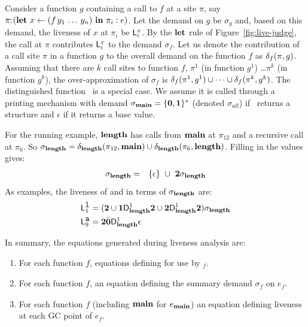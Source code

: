 \documentclass[9pt]{sigplanconf}
\begin{document}
Consider a function $g$ containing a  call to $f$ at a site $\pi$, say
$\pi\!\!:\!(\mbox{$\mathbf{ let}$}~x   \leftarrow   (f\,y_1\,\ldots\,y_n)~\mbox{$\mathbf{ in}$}~\pi_i:e)$.
Let the  demand on $g$  be $\sigma_g$ and,  based on this  demand, the
liveness of  $x$ at $\pi_i$ be  $\mathsf{L}_{{i}}^{x}$.  By the  $\mbox{$\mathbf{ let}$}$ rule of
Figure~\ref{fig:live-judge},    the   call   at    $\pi$   contributes
$\mathsf{L}_{{i}}^{x}$ to the demand $\sigma_f$. Let us denote the contribution
of a call  site $\pi$ in a  function $g$ to the overall  demand on the
function $f$  as $\delta_{f}({\pi},{g})$. Assuming that  there are $k$
call sites to function $f$, $\pi^1$ (in function $g^1$) \ldots $\pi^k$
(in   function  $g^k$),  the   over-approximation  of   $\sigma_f$  is
$\delta_{f}({\pi^1},{g^1})          \cup          \cdots          \cup
\delta_{f}({\pi^k},{g^k})$.  The distinguished function \mainpgm\ is a
special case.   We assume  it is called  through a  printing mechanism
with   demand   $\sigma_{\mathbf{main}}   =  \{\mathbf{0},\mathbf{1}\}^\ast$ (denoted
$\sigma_{\!all}$) if \mainpgm\ returns a structure and $\epsilon$ if
it returns a base value.


For  the  running  example,   $\mathbf{length}$  has  calls  from  $\mathbf{main}$  at
$\pi_{12}$ and a recursive call at $\pi_6$.
So $\sigma_{\mathbf{length}} =
     \delta_{\mathbf{length}}({\pi_{12}},{\mathbf{main}})  \cup
\delta_{\mathbf{length}}({\pi_6},{\mathbf{length}})$.
Filling in  the values gives:
\begin{eqnarray*}
\sigma_{\mathbf{length}}    &=&
 \{\epsilon\}  ~\cup~{{\mathbf{2}}\sigma_{\mathit{\mathbf{length}}}}
\end{eqnarray*}
As examples, the liveness of  and  in terms
of  $\sigma_{\mathbf{length}}$ are:
\begin{align*}
\mathsf{L}_{{1}}^{\mbox{\tt l}} &= ({\mathbf{2}} \cup \mathbf{1}\mathsf{D}_{\mathit {\mathbf{length}}}^{1}{\mathbf{2}}
  \cup {\mathbf{2}}\mathsf{D}_{\mathit {\mathbf{length}}}^{1}{{\mathbf{2}}})\sigma_{\mathit{\mathbf{length}}}
 \\
\mathsf{L}_{{9}}^{\mbox{\tt a}} &= {\mathbf{2}} \bar{\mathbf{0}} \mathsf{D}_{\mathit {\mathbf{length}}}^{1}\epsilon
\end{align*}

In summary, the equations generated during liveness analysis are:
\begin{enumerate}
\item   For    each   function   $\mathit{f}$,    equations   defining
 for use by \Lfonly$_{\mathit f}$.
\item  For  each   function  $\mathit{f}$, an  equation  defining
the summary demand  $\sigma_{\mathit f}$ on $e_f$.
\item For each function $\mathit{f}$ (including $\mathbf{main}$ for
  $e_{\mathbf{main}}$)
an equation defining
  liveness at each GC point of $e_{\mathit f}$.
\end{enumerate}
\end{document}
